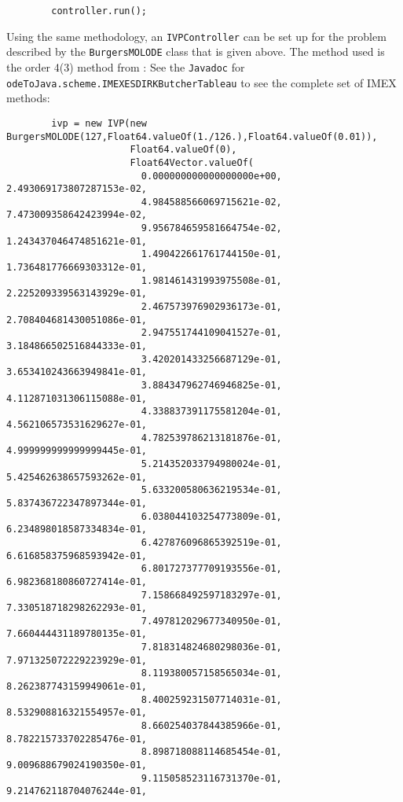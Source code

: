 \documentclass[10pt,letterpaper]{article}
\newcommand\Javadoc{{\tt Javadoc}}
\newcommand\ivpcont{{\tt IVPController}}
\begin{document}
\begin{lstlisting}
        controller.run();
\end{lstlisting}

Using the same methodology, an \ivpcont{} can be set up for the problem
described by the {\tt BurgersMOLODE} class that is given above. The method used
is the order 4(3) method from \cite{KennedyCarpenter2003}: See the \Javadoc{}
for \\ {\tt odeToJava.scheme.IMEXESDIRKButcherTableau} to see the complete
set of IMEX methods:

\begin{lstlisting}
        ivp = new IVP(new BurgersMOLODE(127,Float64.valueOf(1./126.),Float64.valueOf(0.01)),
                      Float64.valueOf(0),
                      Float64Vector.valueOf(
                        0.000000000000000000e+00, 2.493069173807287153e-02,
                        4.984588566069715621e-02, 7.473009358642423994e-02,
                        9.956784659581664754e-02, 1.243437046474851621e-01,
                        1.490422661761744150e-01, 1.736481776669303312e-01,
                        1.981461431993975508e-01, 2.225209339563143929e-01,
                        2.467573976902936173e-01, 2.708404681430051086e-01,
                        2.947551744109041527e-01, 3.184866502516844333e-01,
                        3.420201433256687129e-01, 3.653410243663949841e-01,
                        3.884347962746946825e-01, 4.112871031306115088e-01,
                        4.338837391175581204e-01, 4.562106573531629627e-01,
                        4.782539786213181876e-01, 4.999999999999999445e-01,
                        5.214352033794980024e-01, 5.425462638657593262e-01,
                        5.633200580636219534e-01, 5.837436722347897344e-01,
                        6.038044103254773809e-01, 6.234898018587334834e-01,
                        6.427876096865392519e-01, 6.616858375968593942e-01,
                        6.801727377709193556e-01, 6.982368180860727414e-01,
                        7.158668492597183297e-01, 7.330518718298262293e-01,
                        7.497812029677340950e-01, 7.660444431189780135e-01,
                        7.818314824680298036e-01, 7.971325072229223929e-01,
                        8.119380057158565034e-01, 8.262387743159949061e-01,
                        8.400259231507714031e-01, 8.532908816321554957e-01,
                        8.660254037844385966e-01, 8.782215733702285476e-01,
                        8.898718088114685454e-01, 9.009688679024190350e-01,
                        9.115058523116731370e-01, 9.214762118704076244e-01,

\end{lstlisting}
\end{document}
